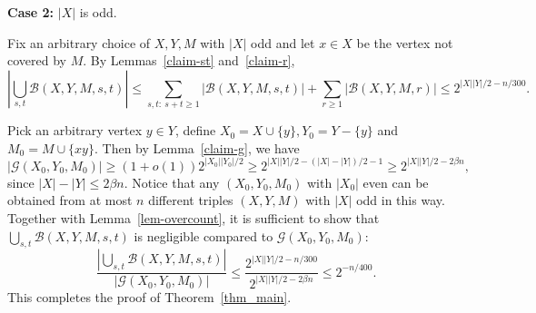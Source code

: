 \documentclass[12pt]{article}
\theoremstyle{definition}
\theoremstyle{definition}
\theoremstyle{definition}
\theoremstyle{definition}
\theoremstyle{definition}
\theoremstyle{definition}
\theoremstyle{definition}
\newcommand{\cG}{\mathcal{G}}
\newcommand{\cB}{\mathcal{B}}
\newcommand{\3}{\bf{3}}
\newcommand{\setm}{-}
\begin{document}
\medskip

\noindent\textbf{Case 2:} $|X|$ is odd.

\medskip

Fix an arbitrary choice of $X,Y,M$ with $|X|$ odd and let $x\in X$ be the vertex not covered by $M$. By Lemmas~\ref{claim-st} and~\ref{claim-r}, 
$$\left|\bigcup_{s,t}\cB(X,Y,M,s,t)\right|\le \displaystyle\sum_{s,t:~ s+t\ge 1}|\cB(X,Y,M,s,t)|+\displaystyle\sum_{r\ge 1}|\cB(X,Y,M,r)|\le 2^{|X||Y|/2-n/300}.$$

Pick an arbitrary vertex $y\in Y$, define $X_0=X\cup\{y\}, Y_0=Y\setm\{y\}$ and $M_0=M\cup\{xy\}$. Then by Lemma~\ref{claim-g}, we have 
$$|\cG(X_0,Y_0,M_0)|\ge (1+o(1))2^{|X_0||Y_0|/2}\ge 2^{|X||Y|/2-(|X|-|Y|)/2-1}\ge 2^{|X||Y|/2-2\beta n},$$
since $|X|-|Y|\le 2\beta n$. Notice that any $(X_0,Y_0,M_0)$ with $|X_0|$ even can be obtained from at most $n$ different triples $(X,Y,M)$ with $|X|$ odd in this way. Together with Lemma~\ref{lem-overcount}, it is sufficient to show that $\bigcup_{s,t}\cB(X,Y,M,s,t)$ is negligible compared to $\cG(X_0,Y_0,M_0)$:
$$\frac{\left|\bigcup_{s,t}\cB(X,Y,M,s,t)\right|}{|\cG(X_0,Y_0,M_0)|}\le\frac{2^{|X||Y|/2-n/300}}{2^{|X||Y|/2-2\beta n}}\le 2^{-n/400}.$$
This completes the proof of Theorem~\ref{thm_main}.
\end{document}
